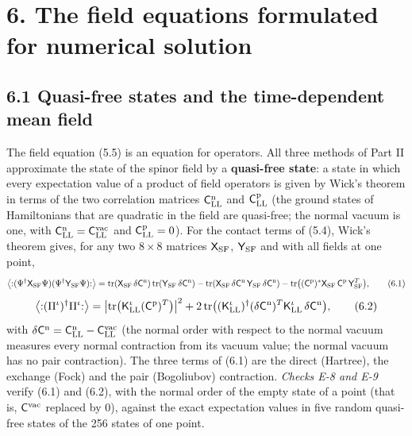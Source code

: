 \documentclass[
  10pt,
]{article}
\begin{document}
\hypertarget{the-field-equations-formulated-for-numerical-solution}{%
\section{6. The field equations formulated for numerical
solution}\label{the-field-equations-formulated-for-numerical-solution}}

\hypertarget{quasi-free-states-and-the-time-dependent-mean-field}{%
\subsection{6.1 Quasi-free states and the time-dependent mean
field}\label{quasi-free-states-and-the-time-dependent-mean-field}}

The field equation (5.5) is an equation for operators. All three methods
of Part II approximate the state of the spinor field by a
\textbf{quasi-free state}: a state in which every expectation value of a
product of field operators is given by Wick's theorem in terms of the
two correlation matrices \(\mathsf C^{\rm n}_{\rm LL}\) and
\(\mathsf C^{\rm p}_{\rm LL}\) (the ground states of Hamiltonians that
are quadratic in the field are quasi-free; the normal vacuum is one,
with \(\mathsf C^{\rm n}_{\rm LL}=\mathsf C^{\rm vac}_{\rm LL}\) and
\(\mathsf C^{\rm p}_{\rm LL}=0\)). For the contact terms of (5.4),
Wick's theorem gives, for any two \(8\times8\) matrices
\(\mathsf X_{\rm SF}\), \(\mathsf Y_{\rm SF}\) and with all fields at
one point,
\[\big\langle{:}(\Psi^\dagger\mathsf X_{\rm SF}\Psi)(\Psi^\dagger\mathsf Y_{\rm SF}\Psi){:}\big\rangle=\mathrm{tr}(\mathsf X_{\rm SF}\,\delta\mathsf C^{\rm n})\,\mathrm{tr}(\mathsf Y_{\rm SF}\,\delta\mathsf C^{\rm n})-\mathrm{tr}(\mathsf X_{\rm SF}\,\delta\mathsf C^{\rm n}\,\mathsf Y_{\rm SF}\,\delta\mathsf C^{\rm n})-\mathrm{tr}\big((\mathsf C^{\rm p})^*\mathsf X_{\rm SF}\,\mathsf C^{\rm p}\,\mathsf Y_{\rm SF}^T\big),\tag{6.1}\]
\[\big\langle{:}(\Pi^\iota)^\dagger\Pi^\iota{:}\big\rangle=\big\lvert\mathrm{tr}\big(\mathsf K^\iota_{\rm LL}(\mathsf C^{\rm p})^T\big)\big\rvert^2+2\,\mathrm{tr}\big((\mathsf K^\iota_{\rm LL})^\dagger(\delta\mathsf C^{\rm n})^T\mathsf K^\iota_{\rm LL}\,\delta\mathsf C^{\rm n}\big),\tag{6.2}\]
with
\(\delta\mathsf C^{\rm n}=\mathsf C^{\rm n}_{\rm LL}-\mathsf C^{\rm vac}_{\rm LL}\)
(the normal order with respect to the normal vacuum measures every
normal contraction from its vacuum value; the normal vacuum has no pair
contraction). The three terms of (6.1) are the direct (Hartree), the
exchange (Fock) and the pair (Bogoliubov) contraction. \emph{Checks E-8
and E-9} verify (6.1) and (6.2), with the normal order of the empty
state of a point (that is, \(\mathsf C^{\rm vac}\) replaced by 0),
against the exact expectation values in five random quasi-free states of
the 256 states of one point.
\end{document}
